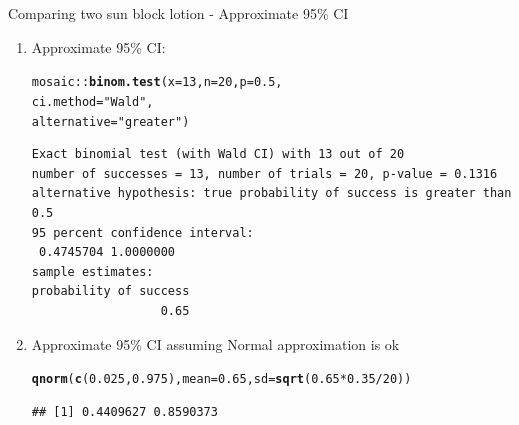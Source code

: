 \documentclass{beamer}\usepackage[]{graphicx}\usepackage[]{color}
\newcommand{\hlnum}[1]{\textcolor[rgb]{0.686,0.059,0.569}{#1}}%
\newcommand{\hlstr}[1]{\textcolor[rgb]{0.192,0.494,0.8}{#1}}%
\newcommand{\hlopt}[1]{\textcolor[rgb]{0,0,0}{#1}}%
\newcommand{\hlstd}[1]{\textcolor[rgb]{0.345,0.345,0.345}{#1}}%
\newcommand{\hlkwc}[1]{\textcolor[rgb]{0.333,0.667,0.333}{#1}}%
\newcommand{\hlkwd}[1]{\textcolor[rgb]{0.737,0.353,0.396}{\textbf{#1}}}%
\newenvironment{knitrout}{}{} %
\begin{document}
\begin{frame}[fragile]{Comparing two sun block lotion - Approximate 95\% CI}
\small
\begin{enumerate}
	\setlength\itemsep{1em}
	
	\item Approximate 95\% CI:
\begin{knitrout}\scriptsize
{}\color{fgcolor}
\begin{alltt}
\hlstd{mosaic}\hlopt{::}\hlkwd{binom.test}\hlstd{(}\hlkwc{x} \hlstd{=} \hlnum{13}\hlstd{,} \hlkwc{n} \hlstd{=} \hlnum{20}\hlstd{,} \hlkwc{p} \hlstd{=} \hlnum{0.5}\hlstd{,}
\hlkwc{ci.method} \hlstd{=} \hlstr{"Wald"}\hlstd{,}
\hlkwc{alternative} \hlstd{=} \hlstr{"greater"}\hlstd{)}
\end{alltt}
\begin{verbatim}
Exact binomial test (with Wald CI) with 13 out of 20 
number of successes = 13, number of trials = 20, p-value = 0.1316
alternative hypothesis: true probability of success is greater than 0.5 
95 percent confidence interval:
 0.4745704 1.0000000 
sample estimates:
probability of success 
                  0.65 
\end{verbatim}

\end{knitrout}
	
		
	\item Approximate 95\% CI assuming Normal approximation is ok 
\begin{knitrout}\scriptsize
{}\color{fgcolor}
\begin{alltt}
\hlkwd{qnorm}\hlstd{(}\hlkwd{c}\hlstd{(}\hlnum{0.025}\hlstd{,} \hlnum{0.975}\hlstd{),} \hlkwc{mean} \hlstd{=} \hlnum{0.65}\hlstd{,} \hlkwc{sd} \hlstd{=} \hlkwd{sqrt}\hlstd{(}\hlnum{0.65}\hlopt{*}\hlnum{0.35} \hlopt{/} \hlnum{20}\hlstd{))}
\end{alltt}
\begin{verbatim}
## [1] 0.4409627 0.8590373
\end{verbatim}

\end{knitrout}
	
\end{enumerate}

\end{frame}
\end{document}
